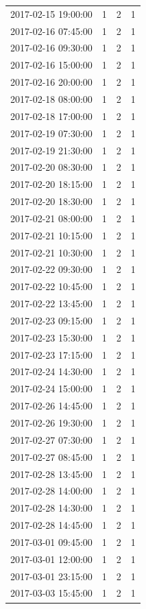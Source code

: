 \begin{tabular}{lrrr}
2017-02-15 19:00:00 & 1 & 2 & 1 \\
2017-02-16 07:45:00 & 1 & 2 & 1 \\
2017-02-16 09:30:00 & 1 & 2 & 1 \\
2017-02-16 15:00:00 & 1 & 2 & 1 \\
2017-02-16 20:00:00 & 1 & 2 & 1 \\
2017-02-18 08:00:00 & 1 & 2 & 1 \\
2017-02-18 17:00:00 & 1 & 2 & 1 \\
2017-02-19 07:30:00 & 1 & 2 & 1 \\
2017-02-19 21:30:00 & 1 & 2 & 1 \\
2017-02-20 08:30:00 & 1 & 2 & 1 \\
2017-02-20 18:15:00 & 1 & 2 & 1 \\
2017-02-20 18:30:00 & 1 & 2 & 1 \\
2017-02-21 08:00:00 & 1 & 2 & 1 \\
2017-02-21 10:15:00 & 1 & 2 & 1 \\
2017-02-21 10:30:00 & 1 & 2 & 1 \\
2017-02-22 09:30:00 & 1 & 2 & 1 \\
2017-02-22 10:45:00 & 1 & 2 & 1 \\
2017-02-22 13:45:00 & 1 & 2 & 1 \\
2017-02-23 09:15:00 & 1 & 2 & 1 \\
2017-02-23 15:30:00 & 1 & 2 & 1 \\
2017-02-23 17:15:00 & 1 & 2 & 1 \\
2017-02-24 14:30:00 & 1 & 2 & 1 \\
2017-02-24 15:00:00 & 1 & 2 & 1 \\
2017-02-26 14:45:00 & 1 & 2 & 1 \\
2017-02-26 19:30:00 & 1 & 2 & 1 \\
2017-02-27 07:30:00 & 1 & 2 & 1 \\
2017-02-27 08:45:00 & 1 & 2 & 1 \\
2017-02-28 13:45:00 & 1 & 2 & 1 \\
2017-02-28 14:00:00 & 1 & 2 & 1 \\
2017-02-28 14:30:00 & 1 & 2 & 1 \\
2017-02-28 14:45:00 & 1 & 2 & 1 \\
2017-03-01 09:45:00 & 1 & 2 & 1 \\
2017-03-01 12:00:00 & 1 & 2 & 1 \\
2017-03-01 23:15:00 & 1 & 2 & 1 \\
2017-03-03 15:45:00 & 1 & 2 & 1 \\

\end{tabular}
